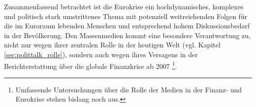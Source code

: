 Zusammenfassend betrachtet ist die Eurokrise ein hochdynamisches, komplexes und politisch stark umstrittenes Thema mit potenziell weitreichenden Folgen für die im Euroraum lebenden Menschen und entsprechend hohem Diskussionsbedarf in der Bevölkerung. Den Massenmedien kommt eine besondere Verantwortung zu, nicht nur wegen ihrer zentralen Rolle in der heutigen Welt (vgl. Kapitel \vref{sec:polittalk_rolle}), sondern auch wegen ihres Versagens in der Berichterstattung über die globale Finanzkrise ab 2007 \parencites{kohlerImBlindflugDurch2009}{thomaSelfFulfillingProphecyDilemma2009}{feussPopularisierungsdilemma2009}{schechterJournalismusHatTeilen2009}\footnote{Umfassende Untersuchungen über die Rolle der Medien in der Finanz- und Eurokrise stehen bislang noch aus.}.